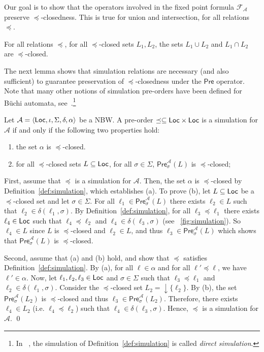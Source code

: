 \documentclass{LMCS}
\newcommand{\Pre}{\mathsf{Pre}}
\newcommand{\closure}[1]{\downarrow \!\!#1}
\renewcommand{\l}{{\ell}}
\newcommand{\Loc}{{\sf Loc}}
\newcommand{\tuple}[1]{\langle #1 \rangle}
\newcommand{\A}{\mathcal{A}}
\newcommand{\F}{\mathcal{F}}
\begin{document}
Our goal is to show that the operators involved in the fixed
point formula $\F_{\A}$ preserve $\preceq$-closedness. This is
true for union and intersection, for all relations $\preceq$.

\begin{lem}\label{lem:closure-properties-a}
  For all relations $\preceq$, for all $\preceq$-closed sets $L_1,L_2$,
  the sets $L_1 \cup L_2$ and $L_1 \cap L_2$ are $\preceq$-closed.
\end{lem}
 
The next lemma shows that simulation relations are necessary (and also sufficient) to
guarantee preservation of $\preceq$-closedness under the $\Pre$ operator.
Note that many other notions of simulation pre-orders have been defined 
for B\"uchi automata, see~\cite{simulations}.\footnote{In ~\cite{simulations},
the simulation of Definition~\ref{def:simulation} is called \emph{direct simulation}.}


\begin{lem}\label{lem:closure-properties-b}
  Let $\A = \tuple{\Loc, \iota, \Sigma, \delta, \alpha}$ be a NBW.
  A pre-order $\preceq \subseteq \Loc \times \Loc$ is a simulation for $\A$
  if and only if the following two properties hold:
  \begin{enumerate}[\em(a)]
    \item the set $\alpha$ is $\preceq$-closed.
    \item for all $\preceq$-closed sets $L \subseteq \Loc$, for all $\sigma \in \Sigma$, $\Pre^{\A}_{\sigma}(L)$ is $\preceq$-closed;
  \end{enumerate}
\end{lem}


\proof 
First, assume that $\preceq$ is a simulation for $\A$.
Then, the set $\alpha$ is $\preceq$-closed by Definition~\ref{def:simulation}, which establishes (a).
To prove (b), let $L \subseteq \Loc$ be a $\preceq$-closed set and let $\sigma \in \Sigma$.
For all $\l_1 \in \Pre^{\A}_{\sigma}(L)$ there exists $\l_2 \in L$ such that 
$\l_2 \in \delta(\l_1,\sigma)$. By Definition~\ref{def:simulation},
for all $\l_3 \preceq \l_1$ there exists $\l_4 \in \Loc$ such that 
$\l_4 \preceq \l_2$ and $\l_4 \in \delta(\l_3,\sigma)$ (see \figurename~\ref{fig:simulation}). 
So $\l_4 \in L$ since $L$ is $\preceq$-closed and $\l_2 \in L$, and thus $\l_3 \in \Pre^{\A}_{\sigma}(L)$
which shows that $\Pre^{\A}_{\sigma}(L)$ is $\preceq$-closed. 

Second, assume that (a) and (b) hold, and show that $\preceq$ satisfies Definition~\ref{def:simulation}.
By (a), for all $\l \in \alpha$ and for all $\l' \preceq \l$, we have $\l' \in \alpha$.
Now, let $\l_1,\l_2,\l_3 \in \Loc$ and $\sigma \in \Sigma$ such that 
$\l_3 \preceq \l_1$ and $\l_2 \in \delta(\l_1,\sigma)$. Consider the 
$\preceq$-closed set $L_2 = \closure{\{\l_2\}}$.
By (b), the set $\Pre^{\A}_{\sigma}(L_2)$ is $\preceq$-closed and thus
$\l_3 \in \Pre^{\A}_{\sigma}(L_2)$. Therefore, there exists $\l_4 \in L_2$ (i.e. 
$\l_4 \preceq \l_2$) such that $\l_4 \in \delta(\l_3,\sigma)$. 
Hence, $\preceq$ is a simulation for $\A$.
\qed
\end{document}
